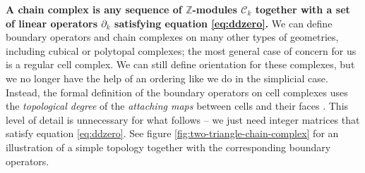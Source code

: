 \documentclass[twocolumn]{article}
\begin{document}
\textbf{A chain complex is any sequence of $\mathbb{Z}$-modules $\mathscr{C}_k$ together with a set of linear operators $\partial_k$ satisfying equation \eqref{eq:ddzero}.}
We can define boundary operators and chain complexes on many other types of geometries, including cubical or polytopal complexes; the most general case of concern for us is a regular cell complex.
We can still define orientation for these complexes, but we no longer have the help of an ordering like we do in the simplicial case.
Instead, the formal definition of the boundary operators on cell complexes uses the \emph{topological degree} of the \emph{attaching maps} between cells and their faces \cite{hatcher2002algebraic}.
This level of detail is unnecessary for what follows -- we just need integer matrices that satisfy equation \eqref{eq:ddzero}.
See figure \ref{fig:two-triangle-chain-complex} for an illustration of a simple topology together with the corresponding boundary operators.
\end{document}
